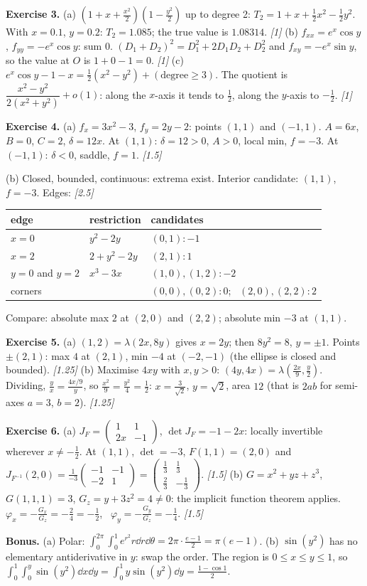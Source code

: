 \textbf{Exercise 3.}
(a) $(1+x+\frac{x^2}2)(1-\frac{y^2}2)$ up to degree 2: $T_2=1+x+\frac12x^2-\frac12y^2$. With
$x=0.1$, $y=0.2$: $T_2=1.085$; the true value is $1.08314$. \hfill\emph{[1]}
(b) $f_{xx}=e^x\cos y$, $f_{yy}=-e^x\cos y$: sum $0$. $(D_1+D_2)^2=D_1^2+2D_1D_2+D_2^2$ and
$f_{xy}=-e^x\sin y$, so the value at $O$ is $1+0-1=0$. \hfill\emph{[1]}
(c) $e^x\cos y-1-x=\frac12(x^2-y^2)+(\text{degree}\ge3)$. The quotient is
$\dfrac{x^2-y^2}{2(x^2+y^2)}+o(1)$: along the $x$-axis it tends to $\frac12$, along the $y$-axis to $-\frac12$. \hfill\emph{[1]}

\textbf{Exercise 4.}
(a) $f_x=3x^2-3$, $f_y=2y-2$: points $(1,1)$ and $(-1,1)$. $A=6x$, $B=0$, $C=2$, $\delta=12x$.
At $(1,1)$: $\delta=12>0$, $A>0$, local min, $f=-3$. At $(-1,1)$: $\delta<0$, saddle, $f=1$. \hfill\emph{[1.5]}

(b) Closed, bounded, continuous: extrema exist. Interior candidate: $(1,1)$, $f=-3$. Edges: \hfill\emph{[2.5]}
\begin{center}\small
\begin{tabular}{@{}lll@{}}\toprule
edge & restriction & candidates\\ \midrule
$x=0$ & $y^2-2y$ & $(0,1)\colon-1$\\
$x=2$ & $2+y^2-2y$ & $(2,1)\colon1$\\
$y=0$ and $y=2$ & $x^3-3x$ & $(1,0),(1,2)\colon-2$\\
corners & & $(0,0),(0,2)\colon0$; \ $(2,0),(2,2)\colon2$\\ \bottomrule
\end{tabular}
\end{center}
Compare: absolute max $2$ at $(2,0)$ and $(2,2)$; absolute min $-3$ at $(1,1)$.

\textbf{Exercise 5.}
(a) $(1,2)=\lambda(2x,8y)$ gives $x=2y$; then $8y^2=8$, $y=\pm1$. Points $\pm(2,1)$: max $4$ at
$(2,1)$, min $-4$ at $(-2,-1)$ (the ellipse is closed and bounded). \hfill\emph{[1.25]}
(b) Maximise $4xy$ with $x,y>0$: $(4y,4x)=\lambda(\frac{2x}9,\frac{y}2)$. Dividing,
$\frac yx=\frac{4x/9}{y}$, so $\frac{x^2}9=\frac{y^2}4=\frac12$: $x=\frac3{\sqrt2}$, $y=\sqrt2$, area $12$
(that is $2ab$ for semi-axes $a=3$, $b=2$). \hfill\emph{[1.25]}

\textbf{Exercise 6.}
(a) $J_F=\begin{pmatrix}1&1\\2x&-1\end{pmatrix}$, $\det J_F=-1-2x$: locally invertible wherever
$x\ne-\frac12$. At $(1,1)$, $\det=-3$, $F(1,1)=(2,0)$ and
$J_{F^{-1}}(2,0)=\frac1{-3}\begin{pmatrix}-1&-1\\-2&1\end{pmatrix}=\begin{pmatrix}\frac13&\frac13\\[2pt]\frac23&-\frac13\end{pmatrix}$. \hfill\emph{[1.5]}
(b) $G=x^2+yz+z^3$, $G(1,1,1)=3$, $G_z=y+3z^2=4\ne0$: the implicit function theorem applies.
$\varphi_x=-\frac{G_x}{G_z}=-\frac24=-\frac12$, \ $\varphi_y=-\frac{G_y}{G_z}=-\frac14$. \hfill\emph{[1.5]}

\textbf{Bonus.}
(a) Polar: $\int_0^{2\pi}\!\!\int_0^1e^{r^2}r\dd r\dd\theta=2\pi\cdot\frac{e-1}2=\pi(e-1)$.
(b) $\sin(y^2)$ has no elementary antiderivative in $y$: swap the order. The region is
$0\le x\le y\le1$, so $\int_0^1\!\int_0^y\sin(y^2)\dd x\dd y=\int_0^1y\sin(y^2)\dd y=\frac{1-\cos1}2$.
